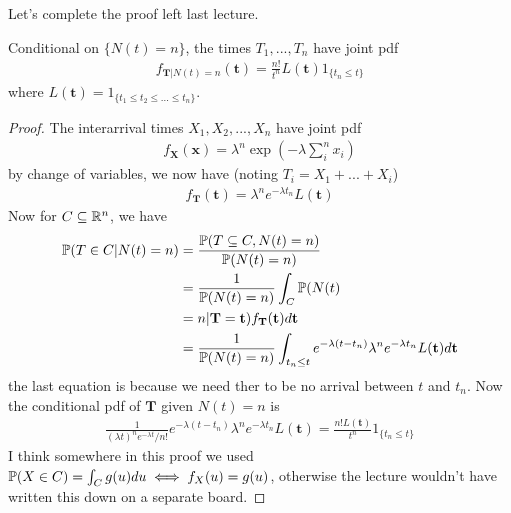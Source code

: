 \documentclass[a4paper]{article}
\begin{document}
Let's complete the proof left last lecture.

\begin{thm}
Conditional on $\{N(t) = n\}$, the times $T_1,...,T_n$ have joint pdf
\begin{equation*}
\begin{aligned}
f_{ \mathbf{T} |N(t) = n} (\mathbf{t}) = \frac{n!}{t^n} L(\mathbf{t}) 1_{\{t_n \leq t\}}
\end{aligned}
\end{equation*}
where $L(\mathbf{t}) = 1_{\{t_1 \leq t_2 \leq ... \leq t_n\}}$.
\begin{proof}
The interarrival times $X_1,X_2,...,X_n$ have joint pdf
\begin{equation*}
\begin{aligned}
f_\mathbf{X}(\mathbf{x}) = \lambda^n \exp(-\lambda \sum_i^n x_i)
\end{aligned}
\end{equation*}
by change of variables, we now have (noting $T_i = X_1+...+X_i$)
\begin{equation*}
\begin{aligned}
f_\mathbf{T} (\mathbf{t}) = \lambda^n e^{-\lambda t_n} L(\mathbf{t})
\end{aligned}
\end{equation*}
Now for $C \subseteq \R^n$, we have
\begin{equation*}
\begin{aligned}
\P(T \in C | N(t) = n) &= \frac{\P(T \subseteq C, N(t) = n)}{\P(N(t) = n)}\\
&= \frac{1}{\P(N(t)=n)} \int_C \P(N(t)\\
&= n | \mathbf{T} = \mathbf{t} ) f_\mathbf{T} (\mathbf{t}) d \mathbf{t}\\
&= \frac{1}{\P(N(t) = n)} \int_{t_n \leq t} e^{-\lambda (t-t_n)}\lambda^n e^{-\lambda t_n} L(\mathbf{t}) d\mathbf{t}
\end{aligned}
\end{equation*}
the last equation is because we need ther to be no arrival between $t$ and $t_n$. Now the conditional pdf of $\mathbf{T}$ given $N(t) = n$ is
\begin{equation*}
\begin{aligned}
\frac{1}{(\lambda t)^n e^{-\lambda t} / n!} e^{-\lambda (t-t_n)} \lambda^n e^{-\lambda t_n} L(\mathbf{t}) = \frac{n! L(\mathbf{t})}{t^n} 1_{\{t_n \leq t\}}
\end{aligned}
\end{equation*}
I think somewhere in this proof we used $\P(X \in C) = \int_C g(u) du \iff f_X(u) = g(u)$, otherwise the lecture wouldn't have written this down on a separate board.
\end{proof}
\end{thm}
\end{document}
